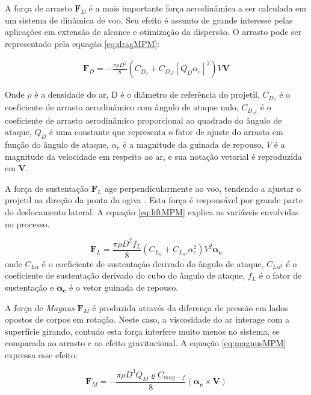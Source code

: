 A força de arrasto \(\boldsymbol{F}_{D}\) é a mais importante força aerodinâmica a ser calculada em um sistema de dinâmica de voo. Seu efeito é assunto de grande interesse pelas aplicações em extensão de alcance e otimização da dispersão. O arrasto pode ser representado pela equação \ref{eq:dragMPM}:

\begin{gather}
    \label{eq:dragMPM}
    \boldsymbol{F}_{D} = -\frac{\pi \rho D^{2}}{8} (C_{D_{0}} + C_{D_{\alpha^{2}}} [Q_{D}\alpha_{e}]^{2})V\boldsymbol{V}
\end{gather}

Onde \(\rho\) é a densidade do ar, D é o diâmetro de referência do projetil, \(C_{D_{0}}\) é o coeficiente de arrasto aerodinâmico com ângulo de ataque nulo, \(C_{D_{\alpha^{2}}}\) é o coeficiente de arrasto aerodinâmico proporcional ao quadrado do ângulo de ataque, \(Q_{D}\) é uma constante que representa o fator de ajuste do arrasto em função do ângulo de ataque, \(\alpha_{e}\) é a magnitude da guinada de repouso, \(V\) é a magnitude da velocidade em respeito ao ar, e sua notação vetorial é reproduzida em \(\boldsymbol{V}\).

A força de sustentação \(\boldsymbol{F}_{L}\) age perpendicularmente ao voo, tendendo a ajustar o projetil na direção da ponta da ogiva \cite{McCoy2012}. Esta força é responsável por grande parte do deslocamento lateral. A equação \ref{eq:liftMPM} explica as variáveis envolvidas no processo.

\begin{equation}
    \label{eq:liftMPM}
    \boldsymbol{F}_{L} = \frac{\pi \rho D^{2} f_{L}}{8} (C_{L_{\alpha}}+C_{L_{\alpha^3}}\alpha_{e}^{2})V^{2} \boldsymbol{\alpha_{e}}
\end{equation}
%
onde \(C_{L\alpha}\) é o coeficiente de sustentação derivado do ângulo de ataque, \(C_{L\alpha^{3}}\) é o coeficiente de sustentação derivado do cubo do ângulo de ataque, \(f_{L}\) é o fator de sustentação e \(\boldsymbol{\alpha_{e}}\) é o vetor guinada de repouso.

A força de \textit{Magnus} \(\boldsymbol{F}_{M}\) é produzida através da diferença de pressão em lados opostos de corpos em rotação. Neste caso, a viscosidade do ar interage com a superfície girando, contudo esta força interfere muito menos no sistema, se comparada ao arrasto e ao efeito gravitacional. A equação \ref{eq:magnusMPM} expressa esse efeito: 

\begin{equation}
    \label{eq:magnusMPM}
    \boldsymbol{F}_{M} = -\frac{\pi \rho D^{3} Q_{M} \varrho C_{mag-f}}{8}(\boldsymbol{\alpha_{e}} \times \boldsymbol{V})
\end{equation}

